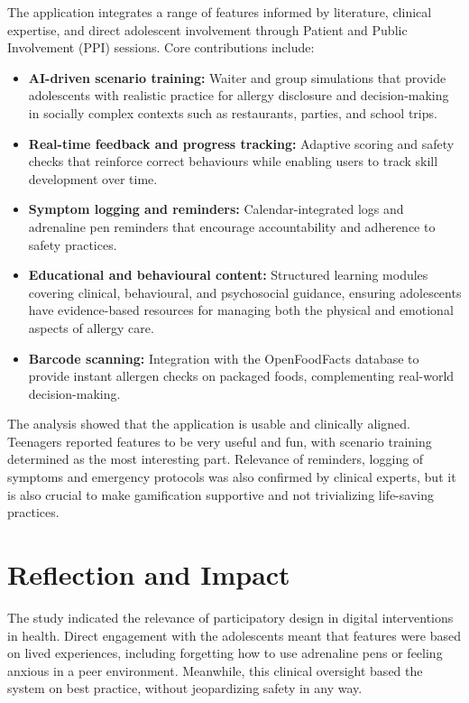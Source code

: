 \documentclass[MScCS]{uccthesis}
\begin{document}
The application integrates a range of features informed by literature, clinical expertise, and direct adolescent involvement through Patient and Public Involvement (PPI) sessions. Core contributions include:  
\begin{itemize}
    \item \textbf{AI-driven scenario training:} Waiter and group simulations that provide adolescents with realistic practice for allergy disclosure and decision-making in socially complex contexts such as restaurants, parties, and school trips.  
    \item \textbf{Real-time feedback and progress tracking:} Adaptive scoring and safety checks that reinforce correct behaviours while enabling users to track skill development over time.  
    \item \textbf{Symptom logging and reminders:} Calendar-integrated logs and adrenaline pen reminders that encourage accountability and adherence to safety practices.  
    \item \textbf{Educational and behavioural content:} Structured learning modules covering clinical, behavioural, and psychosocial guidance, ensuring adolescents have evidence-based resources for managing both the physical and emotional aspects of allergy care.  
    \item \textbf{Barcode scanning:} Integration with the OpenFoodFacts database to provide instant allergen checks on packaged foods, complementing real-world decision-making.  
\end{itemize}  

The analysis showed that the application is usable and clinically aligned. Teenagers reported features to be very useful and fun, with scenario training determined as the most interesting part. Relevance of reminders, logging of symptoms and emergency protocols was also confirmed by clinical experts, but it is also crucial to make gamification supportive and not trivializing life-saving practices.

\section{Reflection and Impact}
The study indicated the relevance of participatory design in digital interventions in health. Direct engagement with the adolescents meant that features were based on lived experiences, including forgetting how to use adrenaline pens or feeling anxious in a peer environment. Meanwhile, this clinical oversight based the system on best practice, without jeopardizing safety in any way. 
\end{document}
